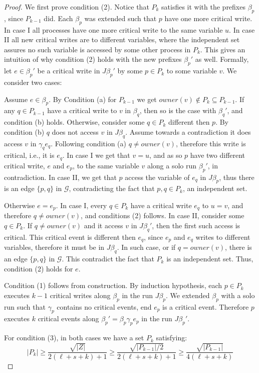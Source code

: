  \begin{proof}
 	We first prove condition (2). Notice that $P_k$ satisfies it with the prefixes $\beta_p$, since $P_{k-1}$ did. Each $\beta_p$ was extended such that $p$ have one more critical write. In case I all processes have one more critical write to the same variable $u$. In case II all new critical writes are to different variables, where the independent set assures no such variable is accessed by some other process in $P_k$. This gives an intuition of why condition (2) holds with the new prefixes $\beta_p'$ as well. Formally, let $e \in \beta_p'$ be a critical write in $J \beta_p'$ by some $p \in P_k$ to some variable $v$. We consider two cases:
 	
 	Assume $e \in \beta_p$. By Condition (a) for $P_{k-1}$ we get $owner(v) \notin P_k \subseteq P_{k-1}$. If any $q \in P_{k-1}$ have a critical write to $v$ in $\beta_q$, then so is the case with $\beta_q'$, and condition (b) holds. Otherwise, consider some $q \in P_k$ different then $p$. By condition (b) $q$ does not access $v$ in $J \beta_q$. Assume towards a contradiction it does access $v$ in $\gamma_q e_q$. Following condition (a) $q \neq owner(v)$, therefore this write is critical, i.e., it is $e_q$. In case I we get that $v=u$, and as so $p$ have two different critical write, $e$ and $e_p$, to the same variable $v$ along a solo run $\beta_p'$, in contradiction. In case II, we get that $p$ access the variable of $e_q$ in $J \beta_p$, thus there is an edge $\{p,q\}$ in $\mathcal{G}$, contradicting the fact that $p,q \in P_k$, an independent set.
 	
 	Otherwise $e=e_p$.
 	In case I, every $q \in P_k$ have a critical write $e_q$ to $u=v$, and therefore $q \neq owner(v)$, and conditions (2) follows.
 	In case II, consider some $q \in P_k$. If $q \neq owner(v)$ and it access $v$ in $J \beta_q'$, then the first such access is critical. This critical event is different then $e_q$, since $e_p$ and $e_q$ writes to different variables, therefore it must be in $J \beta_q$. In such case, or if $q = owner(v)$, there is an edge $\{p,q\}$ in $\mathcal{G}$. This contradict the fact that $P_k$ is an independent set. Thus, condition (2) holds for $e$.
 	
 	Condition (1) follows from construction. By induction hypothesis, each $p \in P_k$ executes $k-1$ critical writes along $\beta_p$ in the run $J \beta_p$. We extended $\beta_p$ with a solo run such that $\gamma_p$ contains no critical events, end $e_p$ is a critical event. Therefore $p$ executes $k$ critical events along $\beta_p' = \beta_p \gamma_p e_p$ in the run $J \beta_p'$.
 	
 	For condition (3), in both cases we have a set $P_k$ satisfying:
 	$$|P_k| \geq \frac{\sqrt{|Z|}}{2(\ell+s+k)+1} \geq \frac{\sqrt{|P_{k-1}|/2}}{2(\ell+s+k)+1} \geq \frac{\sqrt{|P_{k-1}|}}{4(\ell+s+k)}$$
 \end{proof}

